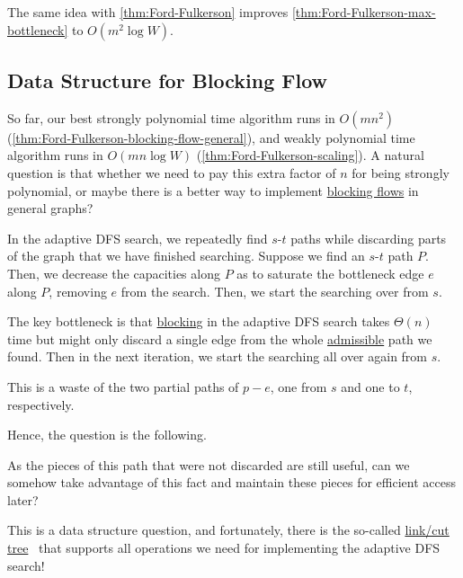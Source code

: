 \begin{remark}
	The same idea with \autoref{thm:Ford-Fulkerson} improves \autoref{thm:Ford-Fulkerson-max-bottleneck} to \(O(m^2 \log W)\).
\end{remark}

\subsection{Data Structure for Blocking Flow}
So far, our best strongly polynomial time algorithm runs in \(O(mn^2)\) (\autoref{thm:Ford-Fulkerson-blocking-flow-general}), and weakly polynomial time algorithm runs in \(O(mn \log W)\) (\autoref{thm:Ford-Fulkerson-scaling}). A natural question is that whether we need to pay this extra factor of \(n\) for being strongly polynomial, or maybe there is a better way to implement \hyperref[def:blocking-flow]{blocking flows} in general graphs?

\begin{prev}
	In the adaptive DFS search, we repeatedly find \(s\)-\(t\) paths while discarding parts of the graph that we have finished searching. Suppose we find an \(s\)-\(t\) path \(P\). Then, we decrease the capacities along \(P\) as to saturate the bottleneck edge \(e\) along \(P\), removing \(e\) from the search. Then, we start the searching over from \(s\).
\end{prev}

The key bottleneck is that \hyperref[algo:general-adaptive-DFS-block]{blocking} in the adaptive DFS search takes \(\Theta (n)\) time but might only discard a single edge from the whole \hyperref[def:admissible]{admissible} path we found. Then in the next iteration, we start the searching all over again from \(s\).

\begin{intuition}
	This is a waste of the two partial paths of \(p-e\), one from \(s\) and one to \(t\), respectively.
\end{intuition}

Hence, the question is the following.
\begin{problem*}
	As the pieces of this path that were not discarded are still useful, can we somehow take advantage of this fact and maintain these pieces for efficient access later?
\end{problem*}
\begin{answer}
	This is a data structure question, and fortunately, there is the so-called \hyperref[def:link-cut-tree]{link/cut tree}~\cite{sleator1985self} that supports all operations we need for implementing the adaptive DFS search!
\end{answer}

